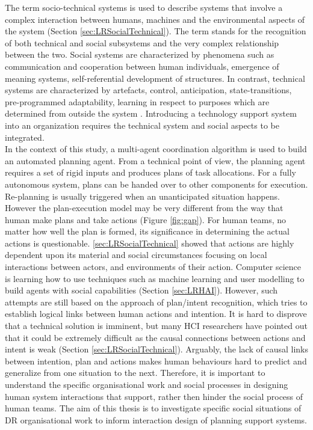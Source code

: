 The term socio-technical systems is used to describe systems that involve a complex interaction between humans, machines and the environmental aspects of the system (Section \ref{sec:LRSocialTechnical}). The term stands for the recognition of both technical and social subsystems and the very complex relationship between the two. Social systems are characterized by phenomena such as communication and cooperation between human individuals, emergence of meaning systems, self-referential development of structures. In contrast, technical systems are characterized by artefacts, control, anticipation, state-transitions, pre-programmed adaptability, learning in respect to purposes which are determined from outside the system \citep{Ropohl1999}. Introducing a technology support system into an organization requires the technical system and social aspects to be integrated.\\

In the context of this study, a multi-agent coordination algorithm is used to build an automated planning agent. From a technical point of view,  the planning agent requires a set of rigid inputs and produces plans of task allocations. For a fully autonomous system, plans can be handed over to other components for execution. Re-planning is usually triggered when an unanticipated situation happens. However the plan-execution model may be very different from the way that human make plans and take actions (Figure \ref{fig:gap}). For human teams, no matter how well the plan is formed, its significance in determining the actual actions is questionable. \ref{sec:LRSocialTechnical} showed that actions are highly dependent upon its material and social circumstances focusing on local interactions between actors, and environments of their action. Computer science is learning how to use techniques such as machine learning and user modelling to build agents with social capabilities (Section \ref{sec:LRHAI}). However, such attempts are still based on the approach of plan/intent recognition, which tries to establish logical links between human actions and intention.  It is hard to disprove that a technical solution is imminent, but many \ac{HCI} researchers have pointed out that it could be extremely difficult as the causal connections between actions and intent is weak (Section \ref{sec:LRSocialTechnical}). Arguably, the lack of causal links between intention, plan and actions makes human behaviours hard to predict and generalize from one situation to the next. Therefore, it is important to understand the specific organisational work and social processes in designing human system interactions that support, rather then hinder the social process of human teams. The aim of this thesis is to investigate specific social situations of \ac{DR} organisational work to inform interaction design of planning support systems. \\

